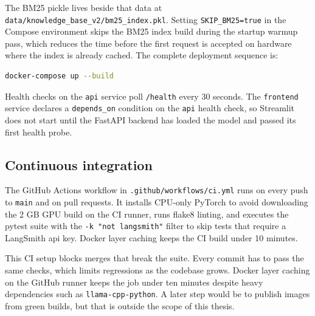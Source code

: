 The BM25 pickle lives beside that data at \texttt{data/knowledge\_\allowbreak base\_v2/bm25\_\allowbreak index.pkl}. Setting \texttt{SKIP\_BM25=true} in the Compose environment skips the BM25 index build during the startup warmup pass, which reduces the time before the first request is accepted on hardware where the index is already cached. The complete deployment sequence is:

\begin{lstlisting}[language=bash, caption=Docker Compose deployment]
docker-compose up --build
\end{lstlisting}

Health checks on the \texttt{api} service poll \texttt{/health} every 30 seconds. The \texttt{frontend} service declares a \texttt{depends\_on} condition on the \texttt{api} health check, so Streamlit does not start until the FastAPI backend has loaded the model and passed its first health probe.

\subsection{Continuous integration}

The GitHub Actions workflow in \texttt{.github/workflows/ci.yml} runs on every push to \texttt{main} and on pull requests. It installs CPU-only PyTorch to avoid downloading the 2 GB GPU build on the CI runner, runs flake8 linting, and executes the pytest suite with the \texttt{-k "not langsmith"} filter to skip tests that require a LangSmith \ac{api} key. Docker layer caching keeps the CI build under 10 minutes.

This CI setup blocks merges that break the suite. Every commit has to pass the same checks, which limits regressions as the codebase grows. Docker layer caching on the GitHub runner keeps the job under ten minutes despite heavy dependencies such as \texttt{llama-cpp-python}. A later step would be to publish images from green builds, but that is outside the scope of this thesis.

